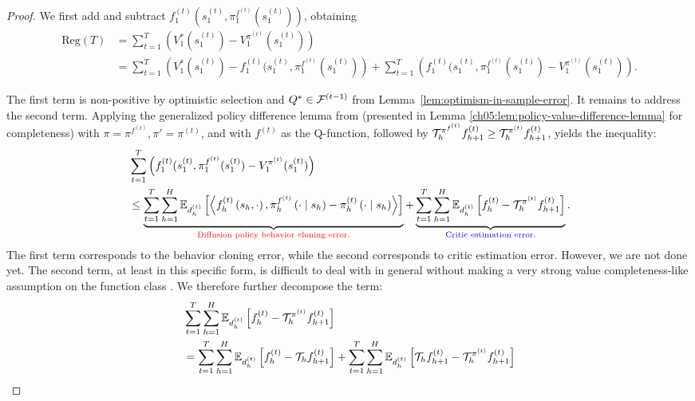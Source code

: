 \begin{proof}
We first add and subtract $f_1^{(t)}(s_1^{(t)}, \pi_1^{f^{(t)}}(s_1^{(t)}))$, obtaining
    \begin{align*}
        \text{Reg}(T) &= \sum_{t=1}^T\left(V_1^{*}(s_1^{(t)})-V_1^{\pi^{(t)}}(s_1^{(t)})\right) \\
        &= \sum_{t=1}^T \left(V_1^{*}(s_1^{(t)})-f_1^{(t)}(s_1^{(t)}, \pi_1^{f^{(t)}}(s_1^{(t)})\right) + \sum_{t=1}^T\left(f_1^{(t)}(s_1^{(t)}, \pi_1^{f^{(t)}}(s_1^{(t)})-V_1^{\pi^{(t)}}(s_1^{(t)})\right) .
    \end{align*}

    The first term is non-positive by optimistic selection and $Q^* \in {\mathcal{F}}^{(t-1)}$ from Lemma~\ref{lem:optimism-in-sample-error}. It remains to address the second term. Applying the generalized policy difference lemma from \citet{efroni2020optimisticpolicyoptimizationbandit, cai2020provably} (presented in Lemma \ref{ch05:lem:policy-value-difference-lemma} for completeness) with $\pi = \pi^{f^{(t)}}, \pi' = \pi^{(t)}$, and with $f^{(t)}$ as the Q-function, followed by ${\mathcal{T}}_h^{\pi^{f^{(t)}}}f_{h+1}^{(t)}\ge{\mathcal{T}}_h^{\pi^{(t)}}f_{h+1}^{(t)}$, yields the inequality:
    \begin{align*}
        &\sum_{t=1}^T\left(f_1^{(t)}(s_1^{(t)}, \pi_1^{f^{(t)}}(s_1^{(t)})-V_1^{\pi^{(t)}}(s_1^{(t)})\right)  \\
        &\leq \underbrace{\sum_{t=1}^T\sum_{h=1}^H \mathbb{E}_{d_h^{(t)}}\left[\left\langle f_h^{(t)}\left(s_h, \cdot\right), \pi_h^{f^{(t)}}\left(\cdot \mid s_h\right)-\pi_h^{(t)}\left(\cdot \mid s_h\right)\right\rangle\right]}_{\textcolor{red}{\text{Diffusion policy behavior cloning error.}}} + \underbrace{\sum_{t=1}^T \sum_{h=1}^H \mathbb{E}_{d_h^{(t)}}\left[f_h^{(t)}-{\mathcal{T}}_h^{\pi^{(t)}}f_{h+1}^{(t)}\right]}_{\textcolor{blue}{\text{Critic estimation error.}}} .
    \end{align*}
    The first term corresponds to the behavior cloning error, while the second corresponds to critic estimation error. However, we are not done yet. The second term, at least in this specific form, is difficult to deal with in general without making a very strong value completeness-like assumption on the function class \citep{liu2023optimistic}. We therefore further decompose the term:
    \begin{align*}
        &\sum_{t=1}^T \sum_{h=1}^H \mathbb{E}_{d_h^{(t)}}\left[f_h^{(t)}-\gT_h^{\pi^{(t)}}f_{h+1}^{(t)}\right]
        \\
        &= \sum_{t=1}^T \sum_{h=1}^H \mathbb{E}_{d_h^{(t)}}\left[f_h^{(t)}-\gT_hf_{h+1}^{(t)}\right] + \sum_{t=1}^T \sum_{h=1}^H \mathbb{E}_{d_h^{(t)}}\left[\gT_h f_{h+1}^{(t)}-\gT_h^{\pi^{(t)}}f_{h+1}^{(t)}\right] \\

\end{align*}
\end{proof}
